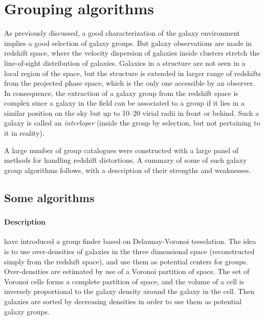 \chapter{Grouping algorithms}
\label{cha:galaxy_group_algorithms}
\minitoc%

As previously discussed, a good characterization of the galaxy environment
implies a good selection of galaxy groups. But galaxy observations are made in
redshift space, where the velocity dispersion of galaxies inside clusters
stretch the line-of-sight distribution of galaxies. Galaxies in a structure are
not seen in a local region of the space, but the structure is extended in
larger range of redshifts from the projected phase space, which is the only one
accessible by an observer. In consequence, the extraction of a galaxy group
from the redshift space is complex since a galaxy in the field can be
associated to a group if it lies in a similar position on the sky but up to
10--20 virial radii in front or behind. Such a galaxy is called an
\emph{interloper} (inside the group by selection, but not pertaining to it in
reality).

A large number of group catalogues were constructed with a large panel of
methods for handling redshift distortions. A summary of some of such galaxy
group algorithms follows, with a description of their strengths and weaknesses.

\section{Some algorithms}
\label{sec:some_algorithms}

\subsection{\citet{Marinoni+02}}
\label{sub:marinoni02}

\subsubsection{Description}
\label{ssub:description}

\cite{Marinoni+02} have introduced a group finder based on Delaunay-Voronoi
tesselation. The idea is to use over-densities of galaxies in the three
dimensional space (reconstructed simply from the redshift space), and use them
as potential centers for groups. Over-densities are estimated by use of a
Voronoi partition of space. The set of Voronoi cells forms a complete partition
of space, and the volume of a cell is inversely proportional to the galaxy
density around the galaxy in the cell. Then galaxies are sorted by decreasing
densities in order to use them as potential galaxy groups.

